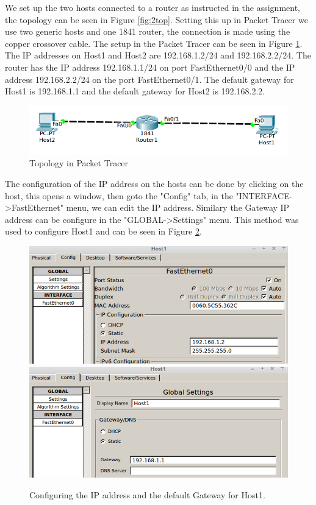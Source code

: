\documentclass{article}
\begin{document}
We set up the two hosts connected to a router as instructed in the assignment, the topology can be seen in Figure \ref{fig:2top}. Setting this up in Packet Tracer we use two generic hosts and one 1841 router, the connection is made using the copper crossover cable. The setup in the Packet Tracer can be seen in Figure \ref{fig:2toppt}. The IP addresses on Host1 and Host2 are 192.168.1.2/24 and 192.168.2.2/24. The router has the IP address 192.168.1.1/24 on port FastEthernet0/0 and the IP address 192.168.2.2/24 on the port FastEthernet0/1. The default gateway for Host1 is 192.168.1.1 and the default gateway for Host2 is 192.168.2.2.

\begin{figure}[h]
    \centering
    \includegraphics[width=\textwidth]{pt2set}
    \caption{Topology in Packet Tracer}
    \label{fig:2toppt}
\end{figure}


The configuration of the IP address on the hosts can be done by clicking on the host, this opens a window, then goto the "Config" tab, in the "INTERFACE-{\textgreater}FastEthernet" menu, we can edit the IP address. Similary the Gateway IP address can be configure in the "GLOBAL-{\textgreater}Settings" menu. This method was used to configure Host1 and can be seen in Figure \ref{fig:host1config}. 

\begin{figure}[h]
    \centering
    \includegraphics[width=\textwidth]{host1inter}
    \vspace{0.8cm}
    \includegraphics[width=\textwidth]{host1gate}
    \caption{Configuring the IP address and the default Gateway for Host1.}
    \label{fig:host1config}
\end{figure}
\end{document}
